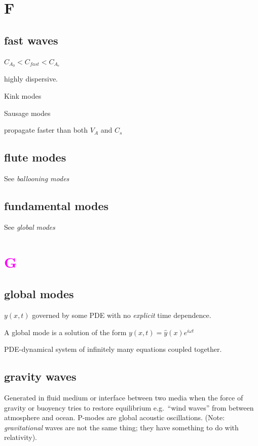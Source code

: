 \documentclass[12pt]{article}
\begin{document}
\section*{F}

\subsection*{fast waves}
\begin{itemize*}
    \item $C_{A_0} < C_{fast} < C_{A_e} $
    \item highly dispersive.
    \item Kink modes
    \item Sausage modes
    \item propagate faster than both $V_A$ and $C_s$
\end{itemize*}

\subsection*{flute modes}
See \emph{ballooning modes}

\subsection*{fundamental modes}
See \emph{global modes}

\section*{\textcolor{magenta}{G}}

\subsection*{global modes}
\begin{itemize*}
    \item $y(x,t)$ governed by some PDE with no \emph{explicit} time dependence.
    \item A global mode is a solution of the form
        $y(x,t) = \hat{y}(x)e^{i\omega t}$
    \item PDE-dynamical system of infinitely many equations coupled together.
\end{itemize*}

\subsection*{gravity waves}
Generated in fluid medium or interface between two media when the
force of gravity or buoyency tries to restore equilibrium
e.g.\ ``wind waves'' from between atmosphere and ocean.
P-modes are global acoustic oscillations.
(Note: \emph{gravitational} waves are not the same thing; they
have something to do with relativity).
\end{document}

